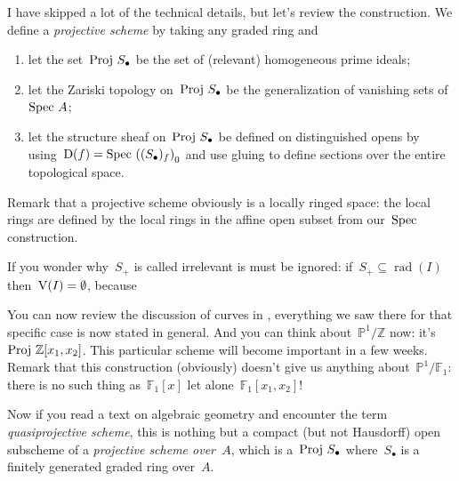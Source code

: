 I have skipped a lot of the technical details, but let's review the construction. We define a \emph{projective scheme} by taking any graded ring and
\begin{enumerate}
  \item let the set~$\operatorname{Proj\,} S_\bullet$ be the set of (relevant) homogeneous prime ideals;
  \item let the Zariski topology on~$\operatorname{Proj\,} S_\bullet$ be the generalization of vanishing sets of~$\operatorname{Spec\,} A$;
  \item let the structure sheaf on~$\operatorname{Proj\,} S_\bullet$ be defined on distinguished opens by using~$\operatorname{D}(f)=\operatorname{Spec\,}\left( (S_\bullet)_f \right)_0$ and use gluing to define sections over the entire topological space.
\end{enumerate}
Remark that a projective scheme obviously is a locally ringed space: the local rings are defined by the local rings in the affine open subset from our~$\operatorname{Spec\,}$ construction.

\begin{remark}
  If you wonder why~$S_+$ is called irrelevant is must be ignored: if~$S_+\subseteq\operatorname{rad}(I)$ then~$\operatorname{V}(I)=\emptyset$, because
\end{remark}

You can now review the discussion of curves in , everything we saw there for that specific case is now stated in general. And you can think about~$\mathbb{P}^1/\mathbb{Z}$ now: it's~$\operatorname{Proj\,}\mathbb{Z}[x_1,x_2]$. This particular scheme will become important in a few weeks. Remark that this construction (obviously) doesn't give us anything about~$\mathbb{P}^1/\mathbb{F}_1$: there is no such thing as~$\mathbb{F}_1[x]$ let alone~$\mathbb{F}_1[x_1,x_2]$!

Now if you read a text on algebraic geometry and encounter the term \emph{quasiprojective scheme}, this is nothing but a compact (but not Hausdorff) open subscheme of a \emph{projective scheme over~$A$}, which is a~$\operatorname{Proj\,} S_\bullet$ where~$S_\bullet$ is a finitely generated graded ring over~$A$.
